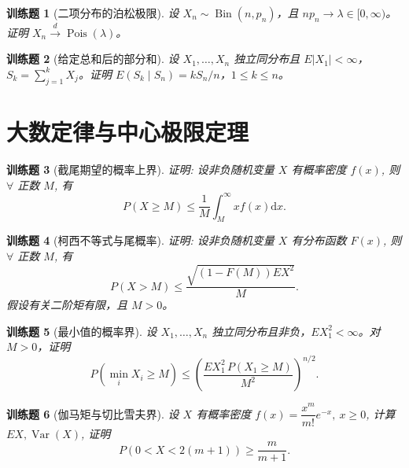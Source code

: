 \documentclass[UTF8,12pt,a4paper,fontset=fandol]{ctexbook}
\newtheorem{exercise}{训练题}[section]
\begin{document}
\begin{exercise}[二项分布的泊松极限]\label{q:A6.34}
设 $X_n\sim\operatorname{Bin}(n,p_n)$，且 $np_n\to\lambda\in[0,\infty)$。证明 $X_n\xrightarrow{d}\operatorname{Pois}(\lambda)$。\par{}\end{exercise}

\begin{exercise}[给定总和后的部分和]\label{q:A6.35}
设 $X_1,\ldots,X_n$ 独立同分布且 $E|X_1|<\infty$，$S_k=\sum_{j=1}^kX_j$。证明 $E(S_k\mid S_n)=kS_n/n$，$1\le k\le n$。\par{}\end{exercise}

\clearpage\section{大数定律与中心极限定理}

\begin{exercise}[截尾期望的概率上界]\label{q:A7.2}
证明: 设非负随机变量 $X$ 有概率密度 $f(x)$, 则 $\forall$ 正数 $M$, 有
    \[P(X\geq M)\leq\dfrac{1}{M}\int_M^\infty xf(x)\mathrm{d}x.\]\par{}\end{exercise}

\begin{exercise}[柯西不等式与尾概率]\label{q:A7.3}
证明: 设非负随机变量 $X$ 有分布函数 $F(x)$, 则 $\forall$ 正数 $M$, 有
    \[P(X>M)\leq\dfrac{\sqrt{(1-F(M))EX^2}}{M}.\] 假设有关二阶矩有限，且 $M>0$。\par{}\end{exercise}

\begin{exercise}[最小值的概率界]\label{q:A7.4}
设 $X_1,\ldots,X_n$ 独立同分布且非负，$EX_1^2<\infty$。对 $M>0$，证明\[P(\min_iX_i\ge M)\le\left(\frac{EX_1^2\,P(X_1\ge M)}{M^2}\right)^{n/2}.\]\par{}\end{exercise}

\begin{exercise}[伽马矩与切比雪夫界]\label{q:A7.5}
设 $X$ 有概率密度 $f(x)=\dfrac{x^m}{m!}e^{-x},\ x\geq0$, 计算 $EX,\operatorname{Var}(X)$, 证明
    \[P(0<X<2(m+1))\geq\dfrac{m}{m+1}.\]\par{}\end{exercise}
\end{document}
